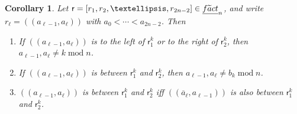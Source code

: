 \documentclass[a4paper,10pt,leqno]{amsart}
\numberwithin{equation}{section}
\newtheorem{corollary}[theorem]{Corollary}
\theoremstyle{definition}
\theoremstyle{remark}
\newcommand{\Ft}{\textsc{f}\widetilde{\textsc{a}}\textsc{ct}}
\newcommand{\EFt}{\underline{\Ft}}
\renewcommand{\mod}{\;\mathrm{mod}\;}
\newcommand{\rr}{\mathsf{r}}
\newcommand{\rrs}{\rr^k_1}
\newcommand{\rrf}{\rr^k_2}
\newcommand{\rrr}{r}
\begin{document}
\begin{corollary}
\label{nest}
Let $\rr = \left[ \rrr_1,\rrr_2,\ldots,\rrr_{2n-2}\right] \in \EFt_n$, and write $\rrr_\ell = (\!(a_{\ell-1}, a_\ell)\!)$ with
$    a_0 < \cdots < a_{2n-2}$.  Then
\begin{enumerate}[label=(\roman*)]
        \item\label{nest2} If $(\!(a_{\ell-1}, a_\ell)\!)$ is to the left of $\rrs$ or to the right of $\rrf$, then $a_{\ell-1}, a_\ell \not= k \mod n$.
        
        \item\label{nest3} If $(\!(a_{\ell-1}, a_\ell)\!)$ is between $\rrs$ and $\rrf$, then $a_{\ell-1}, a_\ell \not= b_k \mod n$. 

        \item\label{nest4} $(\!(a_{\ell-1}, a_\ell)\!)$ is between $\rrs$ and $\rrf$ iff $(\!(\overline{a}_\ell,a_{\ell-1})\!)$ is also between $\rrs$ and $\rrf$.
    \end{enumerate}
\end{corollary}

\end{document}
